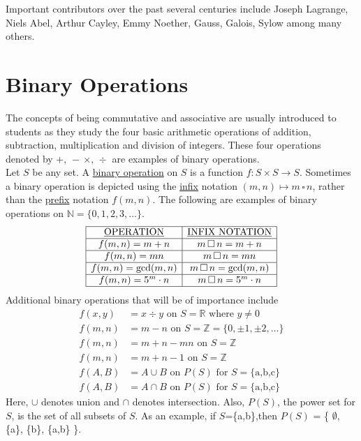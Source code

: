 \documentclass[12pt]{book}
\theoremstyle{definition}
\begin{document}
Important contributors over the past several centuries include Joseph Lagrange, Niels Abel, Arthur Cayley, Emmy Noether, Gauss, Galois, Sylow among many others.
\clearpage


\section{Binary Operations}
The concepts of being commutative and associative are usually introduced to students as they study the four basic arithmetic operations of addition, subtraction, multiplication and division of integers.  These four operations denoted by $+,\,-\,\times,\, \div$ are examples of binary operations.\\[.1in]

Let $S$ be any set.  A \underline{binary operation}  on $S$ is  a function $f:S\times S\rightarrow S$.  Sometimes a binary operation is depicted using the \underline{infix} notation $(m,n)\mapsto m\,\square\, n$, rather than the \underline{prefix} notation $f(m,n)$.  The following are examples of binary operations on $\mathbb{N}=\{0,1,2,3,\dots\}$.\\
$$\begin{array}{|c|c|}
\hline
\underline{\text{OPERATION}}&\underline{\text{INFIX NOTATION}}\\
\hline
f(m,n)=m+n & m\,\square\, n=m+n\\
\hline
f(m,n)=mn & m\,\square\, n=mn\\
\hline
f(m,n)=\text{gcd}(m,n) & m\,\square\, n=\text{gcd}(m,n)\\
\hline
f(m,n)=5^m\cdot n & m\,\square\, n=5^m\cdot n\\
\hline
\end{array}$$
Additional binary operations that will be of importance include
\begin{equation*}\begin{split}
f(x,y)&= x\div y \text{ on }S=\mathbb{R} \text{ where } y\neq0\\
f(m,n)& = m-n \text{ on } S=\mathbb{Z}=\{0,\pm1,\pm2,\dots\}\\
f(m,n)&=m+n-mn \text{ on }S=\mathbb{Z}\\
f(m,n)&=m+n-1 \text{ on }S=\mathbb{Z}\\
f(A,B)&=A\cup B \text{ on } P(S) \text{ for }S=\{\text{a,b,c}\}\\
f(A,B)&=A\cap B \text{ on } P(S) \text{ for }S=\{\text{a,b,c}\}
\end{split}\end{equation*}
Here, $\cup$ denotes union and $\cap$ denotes intersection.  Also, $P(S)$, the power set for $S$, is the set of all subsets of $S$.  As an example, if $S$=\{a,b\},then $P(S)$ = \{ $\emptyset$, \{a\}, \{b\}, \{a,b\} \}.
\end{document}
